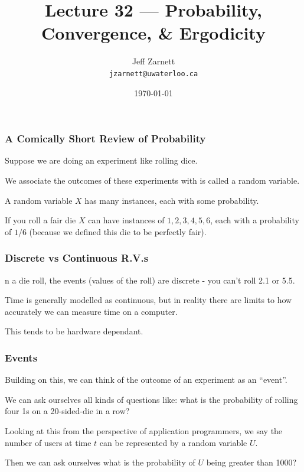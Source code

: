 

\title{Lecture 32 --- Probability, Convergence, \& Ergodicity}

\author{Jeff Zarnett\\ \small \texttt{jzarnett@uwaterloo.ca}}
\date{\today}




\begin{frame}
  \titlepage

 \end{frame}



\begin{frame}
\frametitle{A Comically Short Review of Probability}

Suppose we are doing an experiment like rolling dice.

We associate the outcomes of these experiments with is called a random variable.

A random variable $X$ has many instances, each with some probability.

If you roll a fair die $X$ can have instances of ${1, 2, 3, 4, 5, 6}$, each with a probability of $1/6$ (because we defined this die to be perfectly fair).


\end{frame}



\begin{frame}
\frametitle{Discrete vs Continuous R.V.s}

n a die roll, the events (values of the roll) are discrete - you can't roll 2.1 or 5.5.

Time is generally modelled as continuous, but in reality there are limits to how accurately we can measure time on a computer. 

This tends to be hardware dependant. 

\end{frame}



\begin{frame}
\frametitle{Events}

Building on this, we can think of the outcome of an experiment as an ``event''. 

We can ask ourselves all kinds of questions like: what is the probability of rolling four 1s on a 20-sided-die in a row?

Looking at this from the perspective of application programmers, we say the number of users at time $t$ can be represented by a random variable $U$. 

Then we can ask ourselves what is the probability of $U$ being greater than 1000?

\end{frame}



